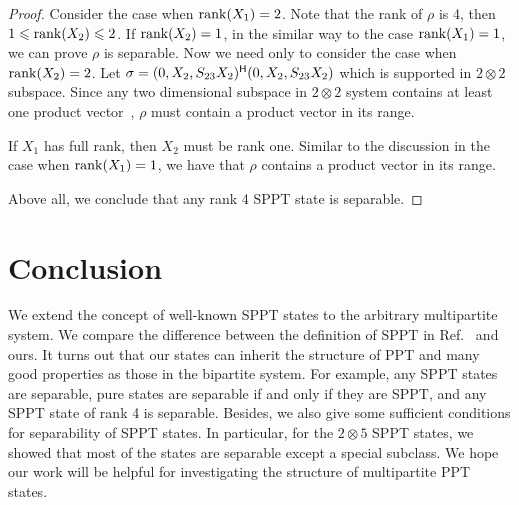 \begin{proof}
  Consider the case when  $\mathrm{rank} (X_1) = 2 $. Note that  the rank of $\rho$ is 4, then $1\leqslant \mathrm{rank} (X_2)\leqslant
  2$. If $\mathrm{rank} (X_2)=1$, in the similar way to the case $\mathrm{rank} (X_1)=1$, we can prove $\rho$ is separable. Now we  need only  to  consider the case when $\mathrm{rank} (X_2) = 2$.
  Let $\sigma = ( 0,X_2,S_{23}X_2)^{\mathsf{H}}{(0,X_2,S_{23}X_2)}$ which is supported in $2\otimes 2$ subspace. Since any two
  dimensional subspace in $2\otimes 2$ system contains at least one product vector~\cite{Sanpera1997},  $\rho$ must contain a product vector
  in its  range.
  
 If $X_1 $ has full rank, then $X_2$ must be  rank one. Similar to the discussion in the case when $\mathrm{rank} (X_1) = 1$,
 we have that  $\rho$ contains a product vector in its range.

 

  Above all, we conclude that any rank 4 SPPT state is separable.
\end{proof}

\section{Conclusion}%
\label{conclusion}
We extend the concept of well-known SPPT states to the arbitrary multipartite system.  We compare the difference between the
definition of SPPT in  Ref.~\cite{SPPT3partite} and ours.  It turns out that our states 
can inherit the structure of PPT and many good properties as those in the bipartite system. For example, any  SPPT states are
separable, pure states are separable if and only if  they are SPPT, and any SPPT state of rank 4 is separable. Besides, we
also give some  sufficient  conditions for separability of SPPT states. In particular, for the $2\otimes 5$ SPPT states,
we showed that 
most of the states are separable except a special subclass.  We hope our work will be helpful for investigating the
structure of 
multipartite PPT states.


